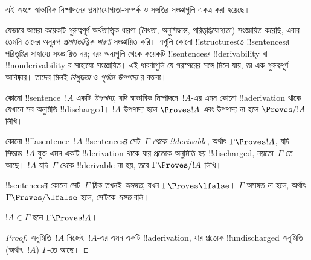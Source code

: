 \documentclass[../../../include/open-logic-section]{subfiles}
\begin{document}
      {}
      {}


\begin{editorial}
এই অংশে স্বাভাবিক নিষ্পাদনের প্রমাণযোগ্যতা-সম্পর্ক ও সঙ্গতির সংজ্ঞাগুলি
একত্র করা হয়েছে।
\end{editorial}

\begin{explain}
যেভাবে আমরা কয়েকটি গুরুত্বপূর্ণ অর্থতাত্ত্বিক ধারণা (বৈধতা,
অনুসিদ্ধান্ত, পরিতৃপ্তিযোগ্যতা) সংজ্ঞায়িত করেছি, এবার তেমনি তাদের
অনুরূপ \emph{প্রমাণতাত্ত্বিক ধারণা} সংজ্ঞায়িত করি। এগুলি কোনো
!!{structure}sতে !!{sentence}sর পরিতৃপ্তির সাহায্যে সংজ্ঞায়িত নয়;
বরং অন্যগুলি থেকে কয়েকটি !!{sentence}sর !!{derivability} বা
!!{nonderivability}-র সাহায্যে সংজ্ঞায়িত। এই ধারণাগুলি যে পরস্পরের
সঙ্গে মিলে যায়, তা এক গুরুত্বপূর্ণ আবিষ্কার। তাদের মিলই
\emph{বিশুদ্ধতা} ও \emph{পূর্ণতা উপপাদ্য}-র বক্তব্য।
\end{explain}


\begin{defn}[উপপাদ্য]
কোনো !!{sentence}~$!A$ একটি \emph{উপপাদ্য}, যদি স্বাভাবিক
নিষ্পাদনে~$!A$-এর এমন কোনো !!a{derivation} থাকে যেখানে সব অনুমিতি
!!{discharged}। $!A$ উপপাদ্য হলে $\Proves !A$ এবং উপপাদ্য না হলে
$\Proves/ !A$ লিখি।
\end{defn}

\begin{defn}[!!^{derivability}]
কোনো !!^a{sentence}~$!A$ !!{sentence}sর সেট~$\Gamma$ \emph{থেকে
!!{derivable}}, অর্থাৎ $\Gamma \Proves !A$, যদি সিদ্ধান্ত~$!A$-যুক্ত
এমন একটি !!{derivation} থাকে যার প্রত্যেক অনুমিতি হয় !!{discharged},
নয়তো~$\Gamma$-তে আছে। $!A$ যদি~$\Gamma$ থেকে !!{derivable} না হয়,
তবে $\Gamma \Proves/ !A$ লিখি।
\end{defn}

\begin{defn}[সঙ্গতি]
!!{sentence}sর কোনো সেট~$\Gamma$ ঠিক তখনই \emph{অসঙ্গত}, যখন
$\Gamma \Proves \lfalse$। $\Gamma$ অসঙ্গত না হলে, অর্থাৎ $\Gamma
\Proves/ \lfalse$ হলে, সেটিকে \emph{সঙ্গত} বলি।
\end{defn}

\begin{prop}[প্রতিবিম্ব ধর্ম]
$!A \in \Gamma$ হলে $\Gamma \Proves !A$।
\end{prop}

\begin{proof}
অনুমিতি~$!A$ নিজেই~$!A$-এর এমন একটি !!a{derivation}, যার প্রত্যেক
!!{undischarged} অনুমিতি (অর্থাৎ~$!A$) $\Gamma$-তে আছে।
\end{proof}
\end{document}
